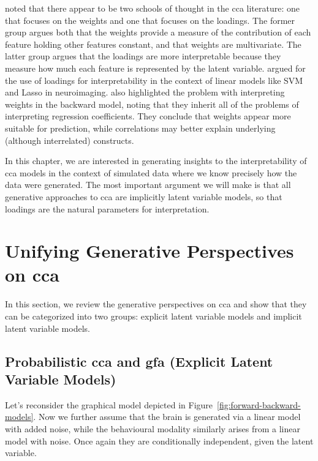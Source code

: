 \citet{gu2018simultaneous} noted that there appear to be two schools of thought in the \acrshort{cca} literature: one that focuses on the weights and one that focuses on the loadings.
The former group argues both that the weights provide a measure of the contribution of each feature holding other features constant, and that weights are multivariate.
The latter group argues that the loadings are more interpretable because they measure how much each feature is represented by the latent variable.
\citet{haufe2014interpretation} argued for the use of loadings for interpretability in the context of linear models like SVM and Lasso in neuroimaging.
\citet{alpert1972interpretation} also highlighted the problem with interpreting weights in the backward model, noting that they inherit all of the problems of interpreting regression coefficients.
They conclude that weights appear more suitable for prediction, while correlations may better explain underlying (although interrelated) constructs.

In this chapter, we are interested in generating insights to the interpretability of \acrshort{cca} models in the context of simulated data where we know precisely how the data were generated.
The most important argument we will make is that all generative approaches to \acrshort{cca} are implicitly latent variable models, so that loadings are the natural parameters for interpretation.

\section{Unifying Generative Perspectives on \acrshort{cca}}\label{sec:generative-perspectives}

In this section, we review the generative perspectives on \acrshort{cca} and show that they can be categorized into two groups: explicit latent variable models and implicit latent variable models.

\subsection{Probabilistic \acrshort{cca} and \acrshort{gfa} (Explicit Latent Variable Models)}

Let's reconsider the graphical model depicted in Figure~\ref{fig:forward-backward-models}.
Now we further assume that the brain is generated via a linear model with added noise, while the behavioural modality similarly arises from a linear model with noise.
Once again they are conditionally independent, given the latent variable.

